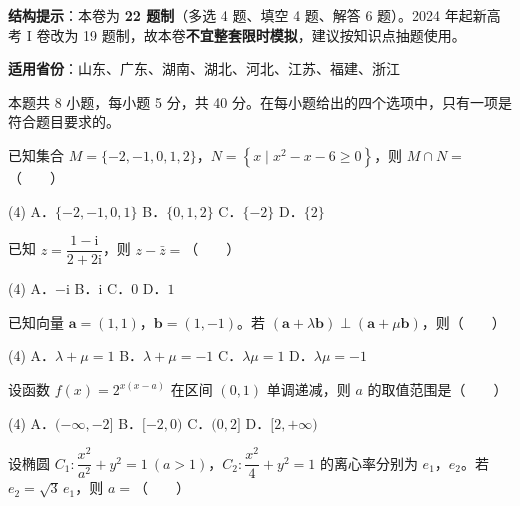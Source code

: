 

\begin{gknotice}
\textbf{结构提示}：本卷为 \textbf{22 题制}（多选 4 题、填空 4 题、解答 6 题）。2024 年起新高考 I 卷改为 19 题制，故本卷\textbf{不宜整套限时模拟}，建议按知识点抽题使用。

\textbf{适用省份}：山东、广东、湖南、湖北、河北、江苏、福建、浙江
\end{gknotice}

\par\medskip


\begin{gktip}
本题共 8 小题，每小题 5 分，共 40 分。在每小题给出的四个选项中，只有一项是符合题目要求的。
\end{gktip}

已知集合 $M=\{-2,-1,0,1,2\}$，$N=\left\{x\mid x^{2}-x-6\ge0\right\}$，则 $M\cap N=$（　　）

\begin{gkopts}(4)
\task A．$\{-2,-1,0,1\}$
\task B．$\{0,1,2\}$
\task C．$\{-2\}$
\task D．$\{2\}$
\end{gkopts}

已知 $z=\dfrac{1-\mathrm i}{2+2\mathrm i}$，则 $z-\bar z=$（　　）

\begin{gkopts}(4)
\task A．$-\mathrm i$
\task B．$\mathrm i$
\task C．$0$
\task D．$1$
\end{gkopts}

已知向量 $\boldsymbol a=(1,1)$，$\boldsymbol b=(1,-1)$。若 $(\boldsymbol a+\lambda\boldsymbol b)\perp(\boldsymbol a+\mu\boldsymbol b)$，则（　　）

\begin{gkopts}(4)
\task A．$\lambda+\mu=1$
\task B．$\lambda+\mu=-1$
\task C．$\lambda\mu=1$
\task D．$\lambda\mu=-1$
\end{gkopts}

设函数 $f(x)=2^{x(x-a)}$ 在区间 $(0,1)$ 单调递减，则 $a$ 的取值范围是（　　）

\begin{gkopts}(4)
\task A．$(-\infty,-2]$
\task B．$[-2,0)$
\task C．$(0,2]$
\task D．$[2,+\infty)$
\end{gkopts}

设椭圆 $C_1:\dfrac{x^{2}}{a^{2}}+y^{2}=1\ (a>1)$，$C_2:\dfrac{x^{2}}4+y^{2}=1$ 的离心率分别为 $e_1$，$e_2$。若 $e_2=\sqrt3\,e_1$，则 $a=$（　　）

